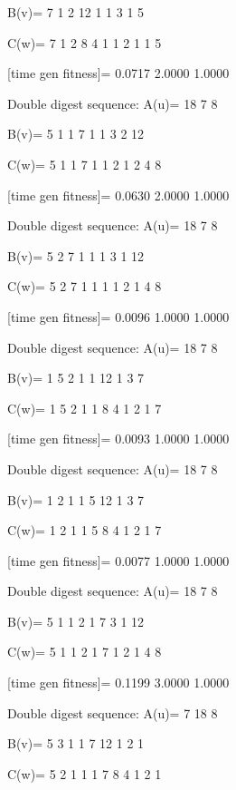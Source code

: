 B(v)=
     7     1     2    12     1     1     3     1     5

C(w)=
     7     1     2     8     4     1     1     2     1     1     5

[time gen fitness]=
    0.0717    2.0000    1.0000

Double digest sequence:
A(u)=
    18     7     8

B(v)=
     5     1     1     7     1     1     3     2    12

C(w)=
     5     1     1     7     1     1     2     1     2     4     8

[time gen fitness]=
    0.0630    2.0000    1.0000

Double digest sequence:
A(u)=
    18     7     8

B(v)=
     5     2     7     1     1     1     3     1    12

C(w)=
     5     2     7     1     1     1     1     2     1     4     8

[time gen fitness]=
    0.0096    1.0000    1.0000

Double digest sequence:
A(u)=
    18     7     8

B(v)=
     1     5     2     1     1    12     1     3     7

C(w)=
     1     5     2     1     1     8     4     1     2     1     7

[time gen fitness]=
    0.0093    1.0000    1.0000

Double digest sequence:
A(u)=
    18     7     8

B(v)=
     1     2     1     1     5    12     1     3     7

C(w)=
     1     2     1     1     5     8     4     1     2     1     7

[time gen fitness]=
    0.0077    1.0000    1.0000

Double digest sequence:
A(u)=
    18     7     8

B(v)=
     5     1     1     2     1     7     3     1    12

C(w)=
     5     1     1     2     1     7     1     2     1     4     8

[time gen fitness]=
    0.1199    3.0000    1.0000

Double digest sequence:
A(u)=
     7    18     8

B(v)=
     5     3     1     1     7    12     1     2     1

C(w)=
     5     2     1     1     1     7     8     4     1     2     1


